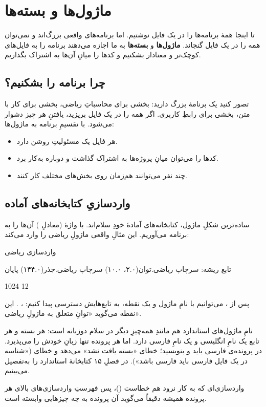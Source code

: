 \chapter{ماژول‌ها و بسته‌ها}%
\label{ch:modules}

تا اینجا همهٔ برنامه‌ها را در یک فایل نوشتیم. اما برنامه‌های واقعی بزرگ‌اند و
نمی‌توان همه را در یک فایل گنجاند. \textbf{ماژول‌ها} و \textbf{بسته‌ها} به ما
اجازه می‌دهند برنامه را به فایل‌های کوچک‌تر و معنادار بشکنیم و کدها را میانِ
آن‌ها به اشتراک بگذاریم.

\section{چرا برنامه را بشکنیم؟}

تصور کنید یک برنامهٔ بزرگ دارید: بخشی برای محاسباتِ ریاضی، بخشی برای کار با
متن، بخشی برای رابطِ کاربری. اگر همه را در یک فایل بریزید، یافتنِ هر چیز دشوار
می‌شود. با تقسیمِ برنامه به ماژول‌ها:
\begin{itemize}
  \item هر فایل یک مسئولیتِ روشن دارد.
  \item کدها را می‌توان میانِ پروژه‌ها به اشتراک گذاشت و دوباره به‌کار برد.
  \item چند نفر می‌توانند هم‌زمان روی بخش‌های مختلف کار کنند.
\end{itemize}

\section{واردسازیِ کتابخانه‌های آماده}

ساده‌ترین شکلِ ماژول، کتابخانه‌های آمادهٔ خودِ سلام‌اند. با واژهٔ
 (معادلِ ) آن‌ها را به برنامه می‌آوریم. این مثالِ
واقعی ماژولِ ریاضی را وارد می‌کند:

\begin{salamfa}
واردسازی ریاضی

تابع ریشه:
    سرچاپ ریاضی.توان(۲.۰، ۱۰.۰)
    سرچاپ ریاضی.جذر(۱۴۴.۰)
پایان
\end{salamfa}

\begin{progoutfa}
1024
12
\end{progoutfa}

پس از ، می‌توانیم با نامِ ماژول و یک نقطه، به تابع‌هایش
دسترسی پیدا کنیم: ، . این نقطه می‌گوید
«توانِ متعلق به ماژولِ ریاضی».

\begin{note}
نامِ ماژول‌های استاندارد هم مانندِ همه‌چیزِ دیگر در سلام دوزبانه است: هر بسته و
هر تابع یک نامِ انگلیسی و یک نامِ فارسی دارد. اما هر پرونده تنها زبانِ خودش را
می‌پذیرد. در پرونده‌ی فارسی باید  و 
بنویسید؛  خطای «بسته یافت نشد» می‌دهد و
 خطای  («شناسه در یک فایل فارسی باید فارسی
باشد»). در فصلِ ۱۵ کتابخانهٔ استاندارد را به‌تفصیل می‌بینیم.

واردسازی‌ای که به کار نرود هم خطاست ()، پس فهرستِ واردسازی‌های بالای
هر پرونده همیشه دقیقاً می‌گوید آن پرونده به چه چیزهایی وابسته است.
\end{note}

